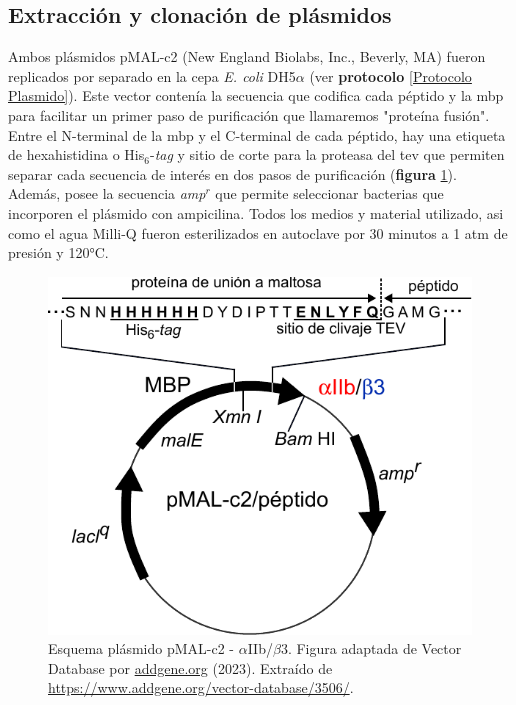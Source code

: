 \subsection{Extracción y clonación de plásmidos}
Ambos plásmidos pMAL-c2 (New England Biolabs, Inc., Beverly, MA) fueron replicados por separado en la cepa \emph{E. coli} DH5$\alpha$ (ver \textbf{protocolo} \ref{Protocolo Plasmido}). Este vector contenía la secuencia que codifica cada péptido y la \ac{mbp} para facilitar un primer paso de purificación que llamaremos "proteína fusión". Entre el N-terminal de la \ac{mbp} y el C-terminal de cada péptido, hay una etiqueta de hexahistidina o His$_{6}$-\emph{tag} y sitio de corte para la proteasa del \ac{tev} que permiten separar cada secuencia de interés en dos pasos de purificación (\textbf{figura} \ref{fig:plasmido}). Además, posee la secuencia \emph{amp$^r$} que permite seleccionar bacterias que incorporen el plásmido con ampicilina. Todos los medios y material utilizado, asi como el agua Milli-Q fueron esterilizados en autoclave por 30 minutos a 1 atm de presión y 120°C.

\begin{figure}[h] %
    \centering
	\includegraphics[width=0.79\linewidth]{fig/01_expe/pmal_c2.pdf}
	\caption[Esquema plásmido pMAL-c2 - $\alpha$IIb/$\beta$3]{Esquema plásmido pMAL-c2 - $\alpha$IIb/$\beta$3. Figura adaptada de Vector Database por \href{https://www.addgene.org/}{addgene.org} (2023). Extraído de \href{https://www.addgene.org/vector-database/3506/}{https://www.addgene.org/vector-database/3506/}.
        }
    \label{fig:plasmido}
\end{figure}


